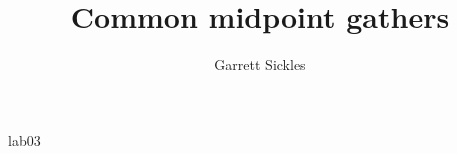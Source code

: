 
\def\thisdoc{lab03}
\def\exedirs{foldmap,viking}

\author{Garrett Sickles}
\title{Common midpoint gathers}{\thisdoc}

%



%

\tiny
\clearpage

\clearpage

\normalsize

